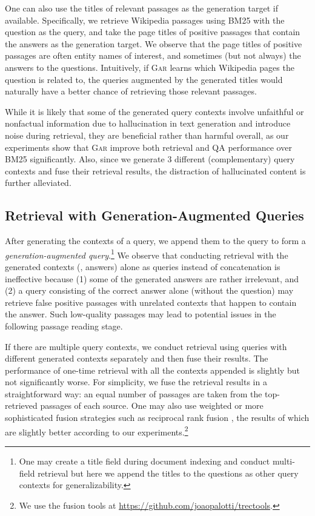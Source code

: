 \documentclass[11pt,a4paper]{article}
\newcommand{\ours}{\textsc{Gar}\xspace}
\begin{document}
One can also use the titles of relevant passages as the generation target if available.
Specifically, we retrieve Wikipedia passages using BM25 with the question as the query, and take the page titles of positive passages that contain the answers as the generation target. 
We observe that the page titles of positive passages are often entity names of interest, and sometimes (but not always) the answers to the questions.
Intuitively, if \ours learns which Wikipedia pages the question is related to, the queries augmented by the generated titles would naturally have a better chance of retrieving those relevant passages.

While it is likely that some of the generated query contexts involve unfaithful or nonfactual information due to hallucination in text generation \cite{mao2020constrained} and introduce noise during retrieval, they are beneficial rather than harmful overall, as our experiments show that \ours improve both retrieval and QA performance over BM25 significantly.
Also, since we generate 3 different (complementary) query contexts and fuse their retrieval results, the distraction of hallucinated content is further alleviated.



\subsection{Retrieval with Generation-Augmented Queries}
\label{sec:retrieval}
After generating the contexts of a query, we append them to the query to form a \textit{generation-augmented query}.\footnote{One may create a title field during document indexing and conduct multi-field retrieval but here we append the titles to the questions as other query contexts for generalizability.}
We observe that conducting retrieval with the  generated contexts (\eg, answers) alone as queries instead of concatenation is ineffective because (1) some of the generated answers are rather irrelevant, and (2) a query consisting of the correct answer alone (without the question) may retrieve false positive passages with unrelated contexts that happen to contain the answer. Such low-quality passages may lead to potential issues in the following passage reading stage.

If there are multiple query contexts, we conduct retrieval using queries with different generated contexts separately and then fuse their results. The performance of one-time retrieval with all the contexts appended is slightly but not significantly worse.
For simplicity, we fuse the retrieval results in a straightforward way: an equal number of passages are taken from the top-retrieved passages of each source.
One may also use weighted or more sophisticated fusion strategies such as reciprocal rank fusion \cite{cormack2009reciprocal}, the results of which are slightly better according to our experiments.\footnote{We use the fusion tools at \url{https://github.com/joaopalotti/trectools}.}
\end{document}
